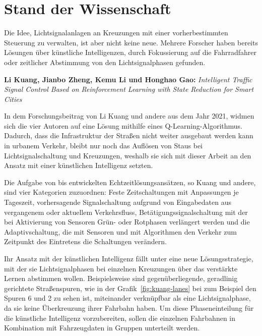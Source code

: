 %
%


\section{Stand der Wissenschaft}\label{sec:state-of-science}

Die Idee, Lichtsignalanlagen an Kreuzungen mit einer vorherbestimmten Steuerung zu verwalten, ist aber nicht keine neue.
Mehrere Forscher haben bereits Lösungen über künstliche Intelligenzen, durch Fokussierung auf die Fahrradfahrer oder zeitlicher Abstimmung von den Lichtsignalphasen gefunden.

\textbf{Li Kuang, Jianbo Zheng, Kemu Li und Honghao Gao:}
\textit{Intelligent Traffic Signal Control Based on Reinforcement Learning with State Reduction for Smart Cities}

In dem Forschungsbeitrag von Li Kuang und andere aus dem Jahr 2021, widmen sich die vier Autoren auf eine Lösung mithilfe eines Q-Learning-Algorithmus.
Dadurch, dass die Infrastruktur der Straßen nicht weiter ausgebaut werden kann in urbanem Verkehr, bleibt nur noch das Auflösen von Staus bei Lichtsignalschaltung und Kreuzungen\cite[S. 2]{Kuang2021}, weshalb sie sich mit dieser Arbeit an den Ansatz mit einer künstlichen Intelligenz setzten.

Die Aufgabe von bis entwickelten Echtzeitlösungsansätzen, so Kuang und andere, sind vier Kategorien zuzuordnen:
Feste Zeitschaltungen mit Anpassungen je Tageszeit, vorhersagende Signalschaltung aufgrund von Eingabedaten aus vergangenem oder aktuellem Verkehrsfluss, Betätigungssignalschaltung mit der bei Aktivierung von Sensoren Grün- oder Rotphasen verlängert werden und die Adaptivschaltung, die mit Sensoren und mit Algorithmen den Verkehr zum Zeitpunkt des Eintretens die Schaltungen verändern\cite[S. 2]{Kuang2021}.

Ihr Ansatz mit der künstlichen Intelligenz fällt unter eine neue Lösungsstrategie, mit der sie Lichtsignalphasen bei einzelnen Kreuzungen über das verstärkte Lernen abstimmen wollen\cite[S. 3]{Kuang2021}.
Beispielsweise sind gegenüberliegende, geradlinig gerichtete Straßenspuren, wie in der Grafik~\ref{fig:kuang-lanes} bei zum Beispiel den Spuren 6 und 2 zu sehen ist, miteinander verknüpfbar als eine Lichtsignalphase, da sie keine Überkreuzung ihrer Fahrbahn haben.
Um diese Phaseneinteilung für die künstliche Intelligenz vorzubereiten, sollen die einzelnen Fahrbahnen in Kombination mit Fahrzeugdaten in Gruppen unterteilt werden\cite[S. 6]{Kuang2021}.

